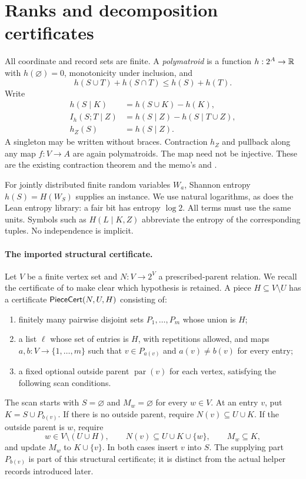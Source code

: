 \section{Ranks and decomposition certificates}\label{sec:preliminaries}

All coordinate and record sets are finite. A \emph{polymatroid} is a
function $h:2^A\to\mathbb{R}$ with $h(\varnothing)=0$, monotonicity under
inclusion, and
\[
h(S\cup T)+h(S\cap T)\le h(S)+h(T).
\]
Write
\begin{align*}
h(S\mid K)&=h(S\cup K)-h(K),\\
I_h(S;T\mid Z)&=h(S\mid Z)-h(S\mid T\cup Z),\\
h_Z(S)&=h(S\mid Z).
\end{align*}
A singleton may be written without braces. Contraction $h_Z$ and
pullback along any map $f:V\to A$ are again polymatroids. The map need
not be injective. These are the existing contraction theorem and the
memo's  and
.

For jointly distributed finite random variables $W_a$, Shannon entropy
$h(S)=H(W_S)$ supplies an instance. We use natural logarithms, as does
the Lean entropy library: a fair bit has entropy $\log 2$. All terms
must use the same units. Symbols such as $H(L\mid K,Z)$ abbreviate the
entropy of the corresponding tuples. No independence is implicit.

\paragraph{The imported structural certificate.}
Let $V$ be a finite vertex set and $N:V\to2^V$ a prescribed-parent
relation. We recall the certificate of \cite{SeventhPaper2026} to make
clear which hypothesis is retained. A piece $H\subseteq V\setminus U$
has a certificate $\mathsf{PieceCert}(N,U,H)$ consisting of:
\begin{enumerate}[label=(\roman*)]
\item finitely many pairwise disjoint sets $P_1,\ldots,P_m$ whose union
is $H$;
\item a list $\ell$ whose set of entries is $H$, with repetitions
allowed, and maps $a,b:V\to\{1,\ldots,m\}$ such that
$v\in P_{a(v)}$ and $a(v)\ne b(v)$ for every entry;
\item a fixed optional outside parent $\operatorname{par}(v)$ for each
vertex, satisfying the following scan conditions.
\end{enumerate}
The scan starts with $S=\varnothing$ and $M_w=\varnothing$ for every
$w\in V$. At an entry $v$, put $K=S\cup P_{b(v)}$. If there is no
outside parent, require $N(v)\subseteq U\cup K$. If the outside parent
is $w$, require
\[
w\in V\setminus(U\cup H),\qquad
N(v)\subseteq U\cup K\cup\{w\},\qquad M_w\subseteq K,
\]
and update $M_w$ to $K\cup\{v\}$. In both cases insert $v$ into $S$.
The supplying part $P_{b(v)}$ is part of this structural certificate;
it is distinct from the actual helper records introduced later.

